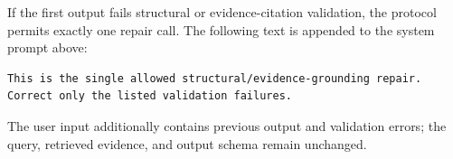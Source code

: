 If the first output fails structural or evidence-citation validation, the protocol permits exactly one repair call.
The following text is appended to the system prompt above:

\begin{lstlisting}
This is the single allowed structural/evidence-grounding repair.
Correct only the listed validation failures.
\end{lstlisting}

The user input additionally contains previous output and
validation errors; the query, retrieved evidence, and output schema remain unchanged.
